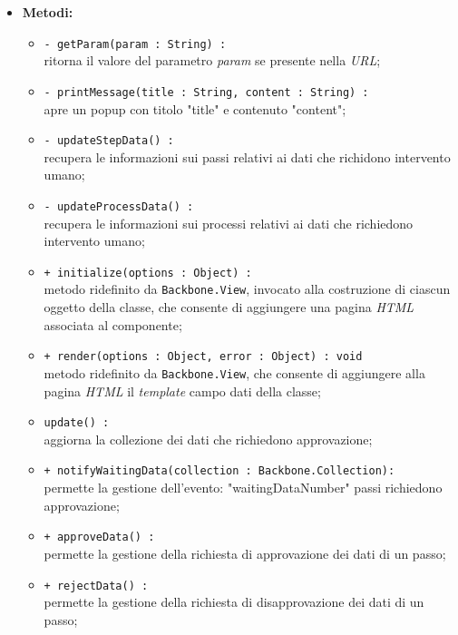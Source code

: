 \begin{flushleft}
\begin{itemize}
\begin{sloppypar}
\begin{itemize}
\end{itemize}
\end{sloppypar}
\item \textbf{Metodi:}
\begin{sloppypar}
\begin{itemize}
\item \texttt{- getParam(param : String) :}\\ ritorna il valore del parametro \textit{param} se presente nella \textit{URL};
  \item \texttt{- printMessage(title : String, content : String) :}\\ apre un popup con titolo "title" e contenuto "content";
  \item \texttt{- updateStepData() :}\\ recupera le informazioni sui passi relativi ai dati che richidono intervento umano;
  \item \texttt{- updateProcessData() :}\\ recupera le informazioni sui processi relativi ai dati che richiedono intervento umano;
\item \texttt{+ initialize(options : Object) :}\\ metodo ridefinito da \texttt{Backbone.View}, invocato alla costruzione di ciascun oggetto della classe, che consente di aggiungere una pagina \textit{HTML} associata al componente;
\item \texttt{+ render(options : Object, error : Object) : void}\\ metodo ridefinito da \texttt{Backbone.View}, che consente di aggiungere alla pagina \textit{HTML} il \textit{template} campo dati della classe;
\item \texttt{update() :}\\ aggiorna la collezione dei dati che richiedono approvazione;
    \item \texttt{+ notifyWaitingData(collection : Backbone.Collection):}\\ permette la gestione dell'evento: "waitingDataNumber" passi richiedono approvazione;
    \item \texttt{+ approveData() :}\\ permette la gestione della richiesta di approvazione dei dati di un passo;
    \item \texttt{+ rejectData() :}\\ permette la gestione della richiesta di disapprovazione dei dati di un passo;
\end{itemize}
\end{sloppypar}
\end{itemize}
\end{flushleft}